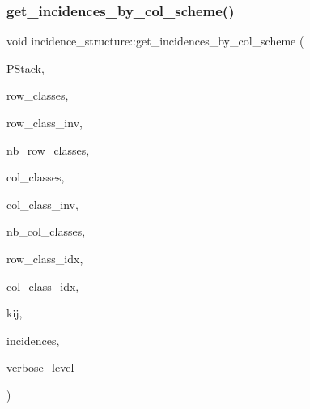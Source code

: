 \mbox{\label{classincidence__structure_adacdd5e58318775f9d3049cbdf47c9ad}} 
\subsubsection{\texorpdfstring{get\+\_\+incidences\+\_\+by\+\_\+col\+\_\+scheme()}{get\_incidences\_by\_col\_scheme()}}
{\footnotesize\ttfamily void incidence\+\_\+structure\+::get\+\_\+incidences\+\_\+by\+\_\+col\+\_\+scheme (\begin{DoxyParamCaption}\item[{\mbox{\hyperlink{classpartitionstack}{partitionstack}} \&}]{P\+Stack,  }\item[{\mbox{\hyperlink{galois_8h_a09fddde158a3a20bd2dcadb609de11dc}{I\+NT}} $\ast$}]{row\+\_\+classes,  }\item[{\mbox{\hyperlink{galois_8h_a09fddde158a3a20bd2dcadb609de11dc}{I\+NT}} $\ast$}]{row\+\_\+class\+\_\+inv,  }\item[{\mbox{\hyperlink{galois_8h_a09fddde158a3a20bd2dcadb609de11dc}{I\+NT}}}]{nb\+\_\+row\+\_\+classes,  }\item[{\mbox{\hyperlink{galois_8h_a09fddde158a3a20bd2dcadb609de11dc}{I\+NT}} $\ast$}]{col\+\_\+classes,  }\item[{\mbox{\hyperlink{galois_8h_a09fddde158a3a20bd2dcadb609de11dc}{I\+NT}} $\ast$}]{col\+\_\+class\+\_\+inv,  }\item[{\mbox{\hyperlink{galois_8h_a09fddde158a3a20bd2dcadb609de11dc}{I\+NT}}}]{nb\+\_\+col\+\_\+classes,  }\item[{\mbox{\hyperlink{galois_8h_a09fddde158a3a20bd2dcadb609de11dc}{I\+NT}}}]{row\+\_\+class\+\_\+idx,  }\item[{\mbox{\hyperlink{galois_8h_a09fddde158a3a20bd2dcadb609de11dc}{I\+NT}}}]{col\+\_\+class\+\_\+idx,  }\item[{\mbox{\hyperlink{galois_8h_a09fddde158a3a20bd2dcadb609de11dc}{I\+NT}}}]{kij,  }\item[{\mbox{\hyperlink{galois_8h_a09fddde158a3a20bd2dcadb609de11dc}{I\+NT}} $\ast$\&}]{incidences,  }\item[{\mbox{\hyperlink{galois_8h_a09fddde158a3a20bd2dcadb609de11dc}{I\+NT}}}]{verbose\+\_\+level }\end{DoxyParamCaption})}

